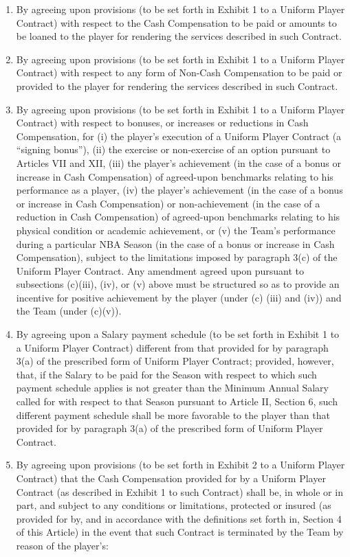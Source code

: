 \documentclass[
]{book}
\providecommand{\tightlist}{%
  \setlength{\itemsep}{0pt}\setlength{\parskip}{0pt}}
\begin{document}
\begin{enumerate}
\def\labelenumi{(\alph{enumi})}
\tightlist
\item
  By agreeing upon provisions (to be set forth in Exhibit 1 to a Uniform Player Contract) with respect to the Cash Compensation to be paid or amounts to be loaned to the player for rendering the services described in such Contract.
\item
  By agreeing upon provisions (to be set forth in Exhibit 1 to a Uniform Player Contract) with respect to any form of Non-Cash Compensation to be paid or provided to the player for rendering the services described in such Contract.
\item
  By agreeing upon provisions (to be set forth in Exhibit 1 to a Uniform Player Contract) with respect to bonuses, or increases or reductions in Cash Compensation, for (i) the player's execution of a Uniform Player Contract (a ``signing bonus''), (ii) the exercise or non-exercise of an option pursuant to Articles VII and XII, (iii) the player's achievement (in the case of a bonus or increase in Cash Compensation) of agreed-upon benchmarks relating to his performance as a player, (iv) the player's achievement (in the case of a bonus or increase in Cash Compensation) or non-achievement (in the case of a reduction in Cash Compensation) of agreed-upon benchmarks relating to his physical condition or academic achievement, or (v) the Team's performance during a particular NBA Season (in the case of a bonus or increase in Cash Compensation), subject to the limitations imposed by paragraph 3(c) of the Uniform Player Contract. Any amendment agreed upon pursuant to subsections (c)(iii), (iv), or (v) above must be structured so as to provide an incentive for positive achievement by the player (under (c) (iii) and (iv)) and the Team (under (c)(v)).
\item
  By agreeing upon a Salary payment schedule (to be set forth in Exhibit 1 to a Uniform Player Contract) different from that provided for by paragraph 3(a) of the prescribed form of Uniform Player Contract; provided, however, that, if the Salary to be paid for the Season with respect to which such payment schedule applies is not greater than the Minimum Annual Salary called for with respect to that Season pursuant to Article II, Section 6, such different payment schedule shall be more favorable to the player than that provided for by paragraph 3(a) of the prescribed form of Uniform Player Contract.
\item
  By agreeing upon provisions (to be set forth in Exhibit 2 to a Uniform Player Contract) that the Cash Compensation provided for by a Uniform Player Contract (as described in Exhibit 1 to such Contract) shall be, in whole or in part, and subject to any conditions or limitations, protected or insured (as provided for by, and in accordance with the definitions set forth in, Section 4 of this Article) in the event that such Contract is terminated by the Team by reason of the player's:


\end{enumerate}
\end{document}
